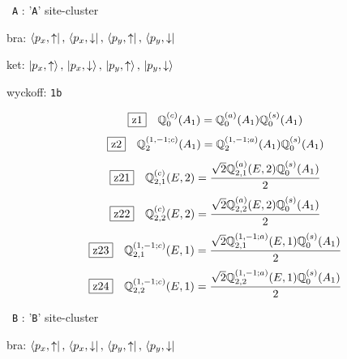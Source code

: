 \documentclass[fleqn,10pt,landscape]{jsarticle}
\begin{document}
\vspace{5mm}

\noindent\textbullet\, \texttt{A} : '\texttt{A}' site-cluster

\noindent\quad * bra: $\bra{p_{x},\uparrow},\, \bra{p_{x},\downarrow},\, \bra{p_{y},\uparrow},\, \bra{p_{y},\downarrow}$

\noindent\quad * ket: $\ket{p_{x},\uparrow},\, \ket{p_{x},\downarrow},\, \ket{p_{y},\uparrow},\, \ket{p_{y},\downarrow}$

\noindent\quad * wyckoff: \texttt{1b}

\begin{dmath*}
\hspace*{3mm}\fbox{z1}\quad \mathbb{Q}_{0}^{(c)}(A_{1})=\mathbb{Q}_{0}^{(a)}(A_{1}) \mathbb{Q}_{0}^{(s)}(A_{1})
\end{dmath*}
\begin{dmath*}
\hspace*{3mm}\fbox{z2}\quad \mathbb{Q}_{2}^{(1,-1;c)}(A_{1})=\mathbb{Q}_{2}^{(1,-1;a)}(A_{1}) \mathbb{Q}_{0}^{(s)}(A_{1})
\end{dmath*}
\begin{dmath*}
\hspace*{3mm}\fbox{z21}\quad \mathbb{Q}_{2,1}^{(c)}(E,2)=\frac{\sqrt{2} \mathbb{Q}_{2,1}^{(a)}(E,2) \mathbb{Q}_{0}^{(s)}(A_{1})}{2}
\end{dmath*}
\begin{dmath*}
\hspace*{3mm}\fbox{z22}\quad \mathbb{Q}_{2,2}^{(c)}(E,2)=\frac{\sqrt{2} \mathbb{Q}_{2,2}^{(a)}(E,2) \mathbb{Q}_{0}^{(s)}(A_{1})}{2}
\end{dmath*}
\begin{dmath*}
\hspace*{3mm}\fbox{z23}\quad \mathbb{Q}_{2,1}^{(1,-1;c)}(E,1)=\frac{\sqrt{2} \mathbb{Q}_{2,1}^{(1,-1;a)}(E,1) \mathbb{Q}_{0}^{(s)}(A_{1})}{2}
\end{dmath*}
\begin{dmath*}
\hspace*{3mm}\fbox{z24}\quad \mathbb{Q}_{2,2}^{(1,-1;c)}(E,1)=\frac{\sqrt{2} \mathbb{Q}_{2,2}^{(1,-1;a)}(E,1) \mathbb{Q}_{0}^{(s)}(A_{1})}{2}
\end{dmath*}
\vspace{5mm}

\noindent\textbullet\, \texttt{B} : '\texttt{B}' site-cluster

\noindent\quad * bra: $\bra{p_{x},\uparrow},\, \bra{p_{x},\downarrow},\, \bra{p_{y},\uparrow},\, \bra{p_{y},\downarrow}$
\end{document}
